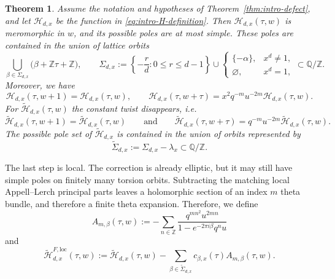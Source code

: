 \documentclass[12pt]{amsart}
\numberwithin{equation}{section}
\newtheorem{theorem}{Theorem}[section]
\newcommand{\QQ}{\mathbb Q}
\newcommand{\ZZ}{\mathbb Z}
\begin{document}
\begin{theorem}%
\label{thm:intro-corrected-lift}
Assume the notation and hypotheses  of Theorem~\ref{thm:intro-defect}, and let
\(\mathcal H_{d,x}\) be the function in \eqref{eq:intro-H-definition}.  Then
\(\mathcal H_{d,x}(\tau,w)\) is meromorphic in \(w\), and its possible poles are
at most simple. These poles are contained in the union of lattice orbits
\begin{equation}\label{eq:intro-Sigma-new}
\bigcup_{\beta\in\Sigma_{d,x}}
\bigl(\beta+\ZZ\tau+\ZZ\bigr),
\qquad
\Sigma_{d,x}:=
\left\{-\frac rd:0\leq r\leq d-1\right\}
\cup
\begin{cases}
\{-\alpha\},&x^d\neq1,\\
\varnothing,&x^d=1,
\end{cases}
\subset\QQ/\ZZ.
\end{equation}
Moreover, we have
\begin{equation}\label{eq:intro-H-twisted-new}
\mathcal H_{d,x}(\tau,w+1)=\mathcal H_{d,x}(\tau,w),
\qquad
\mathcal H_{d,x}(\tau,w+\tau)=
x^2q^{-m}u^{-2m}\mathcal H_{d,x}(\tau,w).
\end{equation}
For $\widetilde{\mathcal H}_{d,x}(\tau,w)$ the constant twist disappears, i.e.
\begin{equation}\label{eq:intro-H-untwisted-new}
\widetilde{\mathcal H}_{d,x}(\tau,w+1)=
\widetilde{\mathcal H}_{d,x}(\tau,w) 
\qquad \text{and} \qquad
\widetilde{\mathcal H}_{d,x}(\tau,w+\tau)=
q^{-m}u^{-2m}\widetilde{\mathcal H}_{d,x}(\tau,w).
\end{equation}
The possible pole set of \(\widetilde{\mathcal H}_{d,x}\) is contained in the
union of orbits represented by
\begin{equation}\label{eq:intro-Sigma-tilde-new}
\widetilde\Sigma_{d,x}:=\Sigma_{d,x}-\lambda_x\subset\QQ/\ZZ.
\end{equation}
\end{theorem}

The last step is local.  The correction is already elliptic, but it may
still have simple poles on finitely many torsion orbits.  Subtracting the
matching local Appell--Lerch principal parts leaves a holomorphic section of
an index \(m\) theta bundle, and therefore a finite theta expansion. Therefore, we define
\[
A_{m,\beta}(\tau,w):=
-\sum_{n\in\ZZ}
\frac{q^{mn^2}u^{2mn}}{1-e^{-2\pi i\beta}q^n u}
\]
and
\begin{equation}\label{eq:intro-polar-subtraction-new}
\widetilde{\mathcal H}^{F,\mathrm{loc}}_{d,x}(\tau,w)
:=
\widetilde{\mathcal H}_{d,x}(\tau,w)
-
\sum_{\beta\in\widetilde\Sigma_{d,x}}
 c_{\beta,x}(\tau)A_{m,\beta}(\tau,w).
\end{equation}
\end{document}
